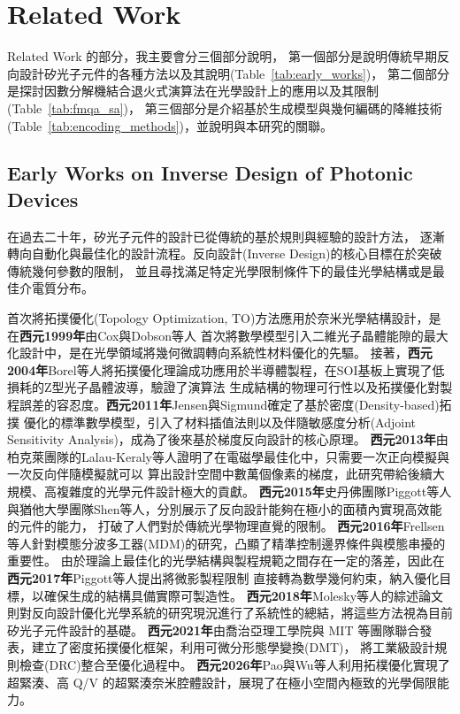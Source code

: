\chapter{Related Work}
\label{ch:relatedwork}
Related Work 的部分，我主要會分三個部分說明，
第一個部分是說明傳統早期反向設計矽光子元件的各種方法以及其說明(Table~\ref{tab:early_works})，
第二個部分是探討因數分解機結合退火式演算法在光學設計上的應用以及其限制(Table~\ref{tab:fmqa_sa})，
第三個部分是介紹基於生成模型與幾何編碼的降維技術(Table~\ref{tab:encoding_methods})，並說明與本研究的關聯。

\section{Early Works on Inverse Design of Photonic Devices}
在過去二十年，矽光子元件的設計已從傳統的基於規則與經驗的設計方法，
逐漸轉向自動化與最佳化的設計流程。反向設計(Inverse Design)的核心目標在於突破傳統幾何參數的限制，
並且尋找滿足特定光學限制條件下的最佳光學結構或是最佳介電質分布。\

首次將拓撲優化(Topology Optimization, TO)方法應用於奈米光學結構設計，是在\cite{cox1999_maximizing}\textbf{西元1999年}由Cox與Dobson等人
首次將數學模型引入二維光子晶體能隙的最大化設計中，是在光學領域將幾何微調轉向系統性材料優化的先驅。
接著，\cite{borel2004_topology}\textbf{西元2004年}Borel等人將拓撲優化理論成功應用於半導體製程，在SOI基板上實現了低損耗的Z型光子晶體波導，驗證了演算法
生成結構的物理可行性以及拓撲優化對製程誤差的容忍度。\cite{jensen2011_topology}\textbf{西元2011年}Jensen與Sigmund確定了基於密度(Density-based)拓撲
優化的標準數學模型，引入了材料插值法則以及伴隨敏感度分析(Adjoint Sensitivity Analysis)，成為了後來基於梯度反向設計的核心原理。
\cite{lalaukeraly2013_adjoint}\textbf{西元2013年}由柏克萊團隊的Lalau-Keraly等人證明了在電磁學最佳化中，只需要一次正向模擬與一次反向伴隨模擬就可以
算出設計空間中數萬個像素的梯度，此研究帶給後續大規模、高複雜度的光學元件設計極大的貢獻。
\textbf{西元2015年}\cite{piggott2015_inverse_design}史丹佛團隊Piggott等人與\cite{shen2015_integrated_pbs}猶他大學團隊Shen等人，分別展示了反向設計能夠在極小的面積內實現高效能的元件的能力，
打破了人們對於傳統光學物理直覺的限制。
\cite{frellsen2016_topology_mdm}\textbf{西元2016年}Frellsen等人針對模態分波多工器(MDM)的研究，凸顯了精準控制邊界條件與模態串擾的重要性。
由於理論上最佳化的光學結構與製程規範之間存在一定的落差，因此在\cite{piggott2017_fabrication}\textbf{西元2017年}Piggott等人提出將微影製程限制
直接轉為數學幾何約束，納入優化目標，以確保生成的結構具備實際可製造性。
\cite{molesky2018_inverse}\textbf{西元2018年}Molesky等人的綜述論文則對反向設計優化光學系統的研究現況進行了系統性的總結，將這些方法視為目前矽光子元件設計的基礎。
\cite{hammond2021_photonic}\textbf{西元2021年}由喬治亞理工學院與 MIT 等團隊聯合發表，建立了密度拓撲優化框架，利用可微分形態學變換(DMT)，
將工業級設計規則檢查(DRC)整合至優化過程中。
\cite{pao2026_nano}	\textbf{西元2026年}Pao與Wu等人利用拓樸優化實現了超緊湊、高 Q/V 的超緊湊奈米腔體設計，展現了在極小空間內極致的光學侷限能力。

